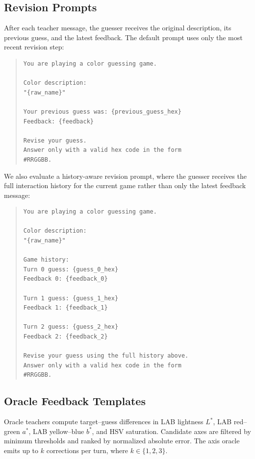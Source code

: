 \documentclass[11pt]{article}
\begin{document}
\subsection{Revision Prompts}

After each teacher message, the guesser receives the original description,
its previous guess, and the latest feedback. The default prompt uses only the
most recent revision step:

\begin{quote}
\small
\begin{verbatim}
You are playing a color guessing game.

Color description:
"{raw_name}"

Your previous guess was: {previous_guess_hex}
Feedback: {feedback}

Revise your guess.
Answer only with a valid hex code in the form 
#RRGGBB.
\end{verbatim}
\end{quote}

We also evaluate a history-aware revision prompt, where the guesser receives
the full interaction history for the current game rather than only the latest
feedback message:

\begin{quote}
\small
\begin{verbatim}
You are playing a color guessing game.

Color description:
"{raw_name}"

Game history:
Turn 0 guess: {guess_0_hex}
Feedback 0: {feedback_0}

Turn 1 guess: {guess_1_hex}
Feedback 1: {feedback_1}

Turn 2 guess: {guess_2_hex}
Feedback 2: {feedback_2}

Revise your guess using the full history above.
Answer only with a valid hex code in the form 
#RRGGBB.
\end{verbatim}
\end{quote}


\subsection{Oracle Feedback Templates}

Oracle teachers compute target--guess differences in LAB lightness
$L^\ast$, LAB red--green $a^\ast$, LAB yellow--blue $b^\ast$, and HSV
saturation. Candidate axes are filtered by minimum thresholds and ranked by
normalized absolute error. The axis oracle emits up to $k$ corrections per
turn, where $k \in \{1,2,3\}$.
\end{document}
